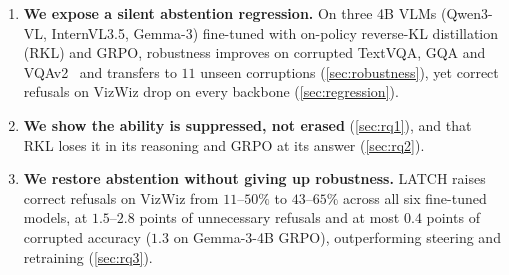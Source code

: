 \begin{enumerate}
\item \textbf{We expose a silent abstention regression.} On three 4B VLMs (Qwen3-VL,
InternVL3.5, Gemma-3) fine-tuned with on-policy reverse-KL distillation (RKL) and GRPO,
robustness improves on corrupted TextVQA, GQA and VQAv2~\cite{singh2019textvqa,
hudson2019gqa,goyal2017vqav2} and transfers to $11$ unseen corruptions
(\cref{sec:robustness}), yet correct refusals on VizWiz drop on every backbone
(\cref{sec:regression}).

\item \textbf{We show the ability is suppressed, not erased} (\cref{sec:rq1}), and that
RKL loses it in its reasoning and GRPO at its answer (\cref{sec:rq2}).

\item \textbf{We restore abstention without giving up robustness.} LATCH raises
correct refusals on VizWiz from $11$--$50\%$ to $43$--$65\%$ across all six fine-tuned
models, at $1.5$--$2.8$ points of unnecessary refusals and at most $0.4$ points of
corrupted accuracy ($1.3$ on Gemma-3-4B GRPO), outperforming steering and retraining
(\cref{sec:rq3}).
\end{enumerate}
